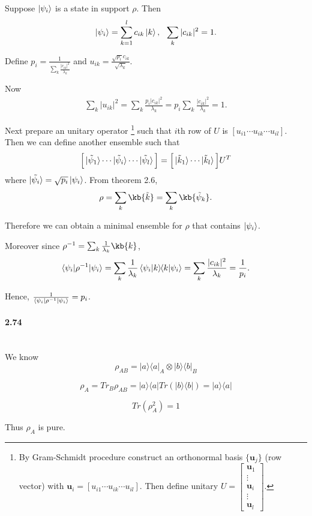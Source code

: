 Suppose $\ket{\psi_i}$ is a state in support $\rho$. Then
\begin{align*}
	\ket{\psi_i} = \sum_{k=1}^l c_{ik} \ket{k}, ~~ \sum_k |c_{ik}|^2 = 1.
\end{align*}

Define $\displaystyle p_i = \frac{1}{\sum_k \frac{|c_{ik}|^2}{\lambda_k} }$ and $\displaystyle u_{ik} = \frac{\sqrt{p_i} c_{ik}}{\sqrt{\lambda_k}}$.

Now
\begin{align*}
	\sum_k |u_{ik}|^2 = \sum_k \frac{p_i | c_{ik} |^2 }{\lambda_k} = p_i \sum_k \frac{| c_{ik} |^2 }{\lambda_k} = 1.
\end{align*}

Next prepare an unitary operator
\footnote{By Gram-Schmidt procedure construct an orthonormal basis $\{\boldsymbol{u}_j\}$ (row vector) with $\boldsymbol{u}_i = [u_{i1} \cdots u_{ik} \cdots u_{il}]$. Then define unitary $U = \begin{bmatrix}
    \boldsymbol{u}_1 \\ 
    \vdots \\ 
    \boldsymbol{u}_i \\ 
    \vdots \\ 
    \boldsymbol{u}_l
    \end{bmatrix}$.}
such that $i$th row of $U$ is $[u_{i1} \cdots u_{ik} \cdots u_{il}]$.
Then we can define another ensemble such that
\begin{align*}
	\Big[  \ket{\tilde{\psi}_1} \cdots  \ket{\tilde{\psi}_i} \cdots \ket{\tilde{\psi}_l}\Big] = \Big[ \ket{\tilde{k}_1} \cdots \ket{\tilde{k}_l} \Big] U^T
\end{align*}
where $\ket{\tilde{\psi_i}} = \sqrt{p_i} \ket{\psi_i}$.
From theorem 2.6,
\begin{align*}
	\rho = \sum_k \kb{\tilde{k}} = \sum_k \kb{\tilde{\psi}_k}.
\end{align*}

Therefore we can obtain a minimal ensemble for $\rho$ that contains $\ket{\psi_i}$.

Moreover since $\rho^{-1} = \sum_k \frac{1}{\lambda_k} \kb{k}$,
\begin{align*}
	\braket{\psi_i | \rho^{-1} | \psi_i} = \sum_k \frac{1}{\lambda_k} \braket{\psi_i | k} \hspace{-1mm} \braket{k | \psi_i} = \sum_k \frac{|c_{ik}|^2}{\lambda_k} = \frac{1}{p_i}.
\end{align*}

Hence, $ \frac{1}{\braket{\psi_i | \rho^{-1} | \psi_i}} = p_i $.


\paragraph{2.74} \textbf{}%
\\

We know
$$ \rho_{AB} = |a\rangle \langle a|_A \otimes |b\rangle \langle b|_B$$

$$\rho_A = Tr_B \rho_{AB} = |a\rangle \langle a| Tr(|b\rangle \langle b|) = |a\rangle \langle a|$$

$$ Tr(\rho_{A}^2) = 1$$

Thus $\rho_{A}$ is pure.


